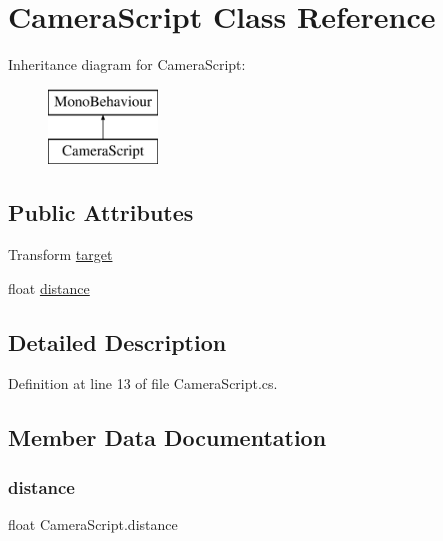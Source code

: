 \hypertarget{class_camera_script}{}\section{Camera\+Script Class Reference}
\label{class_camera_script}
Inheritance diagram for Camera\+Script\+:\begin{figure}[H]
\begin{center}
\leavevmode
\includegraphics[height=2.000000cm]{class_camera_script}
\end{center}
\end{figure}
\subsection*{Public Attributes}
\begin{DoxyCompactItemize}
\item 
Transform \hyperlink{class_camera_script_a0cb84b0b035c8ef0fd33a9698da77b27}{target}
\item 
float \hyperlink{class_camera_script_ae9f7545052003199e6cc184fe1e1ec29}{distance}
\end{DoxyCompactItemize}


\subsection{Detailed Description}


Definition at line 13 of file Camera\+Script.\+cs.



\subsection{Member Data Documentation}
\hypertarget{class_camera_script_ae9f7545052003199e6cc184fe1e1ec29}{}\label{class_camera_script_ae9f7545052003199e6cc184fe1e1ec29} 
\subsubsection{\texorpdfstring{distance}{distance}}
{\footnotesize\ttfamily float Camera\+Script.\+distance}



